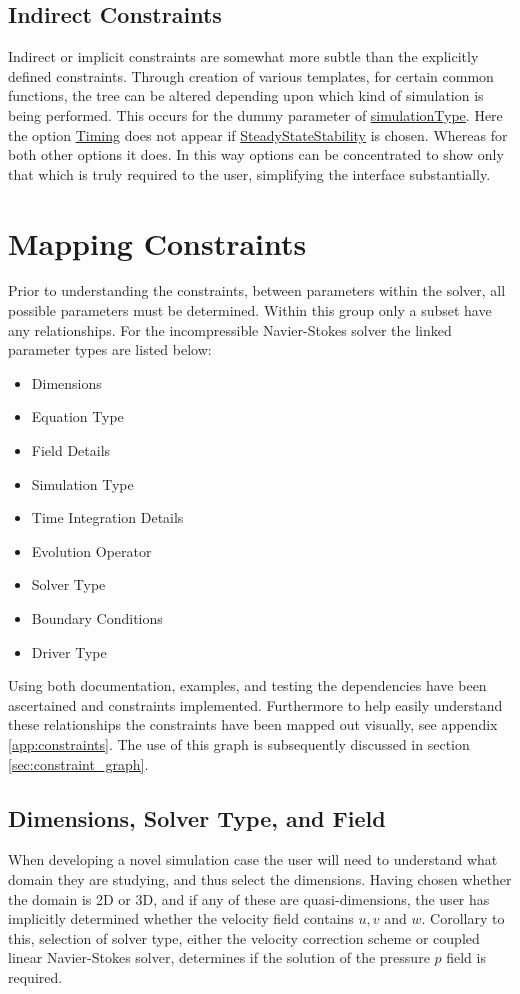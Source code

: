 \documentclass[11pt, a4paper]{report}
\begin{document}
\subsection{Indirect Constraints}
Indirect or implicit constraints are somewhat more subtle than the explicitly defined constraints. Through creation of various templates, for certain common functions, the tree can be altered depending upon which kind of simulation is being performed. This occurs for the dummy parameter of \url{simulationType}. Here the option \url{Timing} does not appear if \url{SteadyStateStability} is chosen. Whereas for both other options it does. In this way options can be concentrated to show only that which is truly required to the user, simplifying the interface substantially.

\section{Mapping Constraints}
Prior to understanding the constraints, between parameters within the solver, all possible parameters must be determined. Within this group only a subset have any relationships. For the incompressible Navier-Stokes solver the linked parameter types are listed below:
\begin{multicols}{3}
\begin{itemize}
\item Dimensions 
\item Equation Type
\item Field Details
\item Simulation Type
\item Time Integration Details
\item Evolution Operator
\item Solver Type
\item Boundary Conditions
\item Driver Type
\end{itemize}
\end{multicols}
Using both documentation, examples, and testing the dependencies have been ascertained and constraints implemented. Furthermore to help easily understand these relationships the constraints have been mapped out visually, see appendix \ref{app:constraints}. The use of this graph is subsequently discussed in section \ref{sec:constraint_graph}.

\subsection{Dimensions, Solver Type, and Field}
When developing a novel simulation case the user will need to understand what domain they are studying, and thus select the dimensions. Having chosen whether the domain is 2D or 3D, and if any of these are quasi-dimensions, the user has implicitly determined whether the velocity field contains $u, v$ and $w$. Corollary to this, selection of solver type, either the velocity correction scheme or coupled linear Navier-Stokes solver, determines if the solution of the pressure $p$ field is required.
\end{document}
